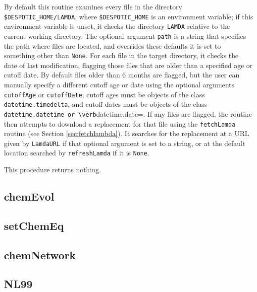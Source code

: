 \documentclass[12pt]{article}
\begin{document}
By default this routine examines every file in the directory \verb=$DESPOTIC_HOME/LAMDA=, where \verb=$DESPOTIC_HOME= is an environment variable; if this environment variable is unset, it checks the directory \verb=LAMDA= relative to the current working directory. The optional argument \verb=path= is a string that specifies the path where files are located, and overrides these defaults it is set to something other than \verb=None=. For each file in the target directory, it checks the date of last modification, flagging those files that are older than a specified age or cutoff date. By default files older than 6 months are flagged, but the user can manually specify a different cutoff age or date using the optional arguments \verb=cutoffAge= or \verb=cutoffDate=; cutoff ages must be objects of the class \verb=datetime.timedelta=, and cutoff dates must be objects of the class \verb=datetime.datetime or \verb=datetime.date=. If any files are flagged, the routine then attempts to download a replacement for that file using the \verb=fetchLamda= routine (see Section \ref{sec:fetchlambda}). It searches for the replacement at a URL given by \verb=LamdaURL= if that optional argument is set to a string, or at the default location searched by \verb=refreshLamda= if it is \verb=None=.

This procedure returns nothing.

\clearpage

\subsection{chemEvol}
\label{sec:chemevol}

\clearpage

\subsection{setChemEq}
\label{sec:setchemeq}

\clearpage

\subsection{chemNetwork}
\label{sec:chemnetwork}

\clearpage

\subsection{NL99}
\label{sec:nl99}

\clearpage
\end{document}
